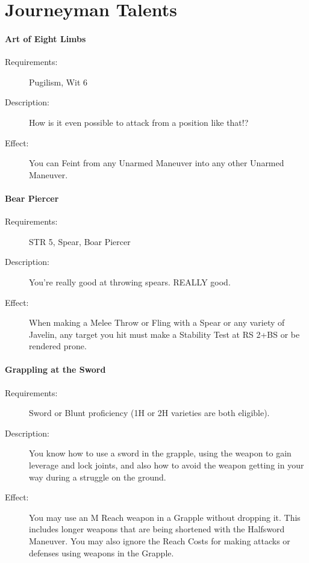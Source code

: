 \documentclass[oneside,11pt,english]{book}
\begin{document}
\section{Journeyman Talents}\label{sec:Journeyman Talents}
\paragraph{\label{talent:Art of Eight Limbs}Art of Eight Limbs}
\begin{description}
	\item [Requirements:] Pugilism, Wit 6 
	\item [Description:] How is it even possible to attack from a position like that!? 
	\item [Effect:] You can Feint from any Unarmed Maneuver into any other Unarmed Maneuver. 
\end{description}

\paragraph{\label{talent:Bear Piercer}Bear Piercer}
\begin{description}
	\item [Requirements:] STR 5, Spear, Boar Piercer 
	\item [Description:] You’re really good at throwing spears. REALLY good. 
	\item [Effect:] When making a Melee Throw or Fling with a Spear or any variety of Javelin, any target you hit must make a Stability Test at RS 2+BS or be rendered prone. 
\end{description}

\paragraph{\label{talent:Grappling at the Sword}Grappling at the Sword}
\begin{description}
	\item [Requirements:] Sword or Blunt proficiency (1H or 2H varieties are both eligible). 
	\item [Description:] You know how to use a sword in the grapple, using the weapon to gain leverage and lock joints, and also how to avoid the weapon getting in your way during a struggle on the ground. 
	\item [Effect:] You may use an M Reach weapon in a Grapple without dropping it. This includes longer weapons that are being shortened with the Halfsword Maneuver. You may also ignore the Reach Costs for making 
	attacks or defenses using weapons in the Grapple.
	
\end{description}
\end{document}
